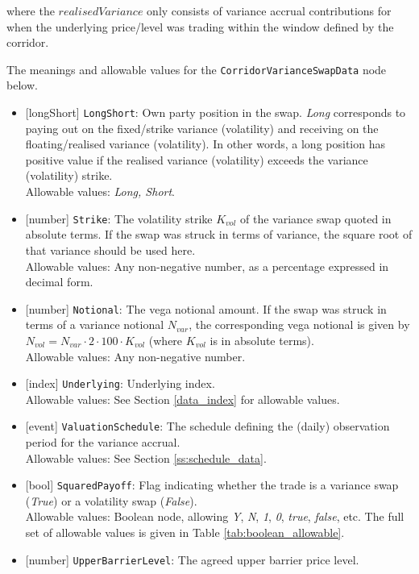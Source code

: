 where the $realisedVariance$ only consists of variance accrual contributions for when the underlying price/level
was trading within the window defined by the corridor.

The meanings and allowable values for the \lstinline!CorridorVarianceSwapData! node below.

\begin{itemize}
  \item{}[longShort] \lstinline!LongShort!: Own party position in the swap. \emph{Long} corresponds to paying out on the
  fixed/strike variance (volatility) and receiving on the floating/realised variance (volatility). In other words,
  a long position has positive value if the realised variance (volatility) exceeds the variance (volatility)
  strike. \\
  Allowable values: \emph{Long, Short}.
  \item{}[number] \lstinline!Strike!: The volatility strike $K_{vol}$ of the variance swap quoted in absolute terms.
  If the swap was struck in terms of variance, the square root of that variance should be used here. \\
  Allowable values: Any non-negative number, as a percentage expressed in decimal form.
  \item{}[number] \lstinline!Notional!: The vega notional amount. If the swap was struck in terms of a variance notional
  $N_{var}$, the corresponding vega notional is given by $N_{vol} = N_{var} \cdot 2 \cdot 100 \cdot K_{vol}$ (where
  $K_{vol}$ is in absolute terms). \\
  Allowable values: Any non-negative number.
  \item{}[index] \lstinline!Underlying!: Underlying index. \\
  Allowable values: See Section \ref{data_index} for allowable values.
  \item{}[event] \lstinline!ValuationSchedule!: The schedule defining the (daily) observation period for the variance accrual. \\
  Allowable values: See Section \ref{ss:schedule_data}.
  \item{}[bool] \lstinline!SquaredPayoff!: Flag indicating whether the trade is a variance swap (\emph{True}) or a volatility
  swap (\emph{False}). \\
  Allowable values: Boolean node, allowing \emph{Y}, \emph{N}, \emph{1}, \emph{0}, \emph{true}, \emph{false}, etc.
  The full set of allowable values is given in Table \ref{tab:boolean_allowable}.
  \item{}[number] \lstinline!UpperBarrierLevel!: The agreed upper barrier price level. \\

\end{itemize}
